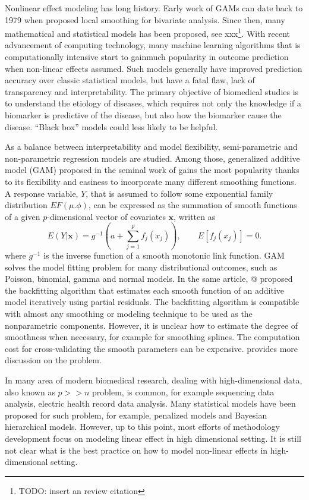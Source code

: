 \documentclass[AMA,STIX1COL,]{WileyNJD-v2}
\begin{document}
Nonlinear effect modeling has long history. Early work of GAMs can date
back to 1979 when \citet{Cleveland1979} proposed local smoothing for
bivariate analysis. Since then, many mathematical and statistical models
has been proposed, see xxx\footnote{TODO: insert an review citation}.
With recent advancement of computing technology, many machine learning
algorithms that is computationally intensive start to gainmuch
popularity in outcome prediction when non-linear effects assumed. Such
models generally have improved prediction accuracy over classic
statistical models, but have a fatal flaw, lack of transparency and
interpretability. The primary objective of biomedical studies is to
understand the etiology of diseases, which requires not only the
knowledge if a biomarker is predictive of the disease, but also how the
biomarker cause the disease. ``Black box'' models could less likely to
be helpful.

As a balance between interpretability and model flexibility,
semi-parametric and non-parametric regression models are studied. Among
those, generalized additive model (GAM) proposed in the seminal work of
\citet{Hastie1987} gains the most popularity thanks to its flexibility
and easiness to incorporate many different smoothing functions. A
response variable, \(Y\), that is assumed to follow some exponential
family distribution \(EF(\mu. \phi)\), can be expressed as the summation
of smooth functions of a given \(p\)-dimensional vector of covariates
\(\boldsymbol{x}\), written as \[
E(Y|\boldsymbol{x}) = g^{-1}(a + \sum\limits^p_{j=1}f_j(x_j)),\qquad E[f_j(x_j)] = 0.
\] where \(g^{-1}\) is the inverse function of a smooth monotonic link
function. GAM solves the model fitting problem for many distributional
outcomes, such as Poisson, binomial, gamma and normal models. In the
same article, @\citet{Hastie1987} proposed the backfitting algorithm
that estimates each smooth function of an additive model iteratively
using partial residuals. The backfitting algorithm is compatible with
almost any smoothing or modeling technique to be used as the
nonparametric components. However, it is unclear how to estimate the
degree of smoothness when necessary, for example for smoothing splines.
The computation cost for cross-validating the smooth parameters can be
expensive. \citet[PP.318-320]{Wood2017} provides more discussion on the
problem.

In many area of modern biomedical research, dealing with
high-dimensional data, also known as \(p >> n\) problem, is common, for
example sequencing data analysis, electric health record data analysis.
Many statistical models have been proposed for such problem, for
example, penalized models and Bayesian hierarchical models. However, up
to this point, most efforts of methodology development focus on modeling
linear effect in high dimensional setting. It is still not clear what is
the best practice on how to model non-linear effects in high-dimensional
setting.
\end{document}
